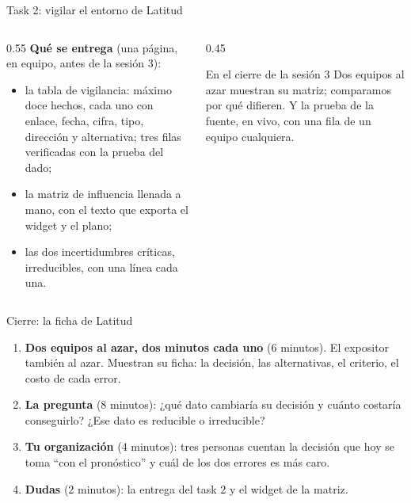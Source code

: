 \documentclass{beamer}
\begin{document}
\begin{frame}{Task 2: vigilar el entorno de Latitud}
\begin{columns}[T]
\begin{column}{0.55\textwidth}
\textbf{Qué se entrega} (una página, en equipo, antes de la sesión 3):
\begin{itemize}
  \item la tabla de vigilancia: máximo doce hechos, cada uno con enlace, fecha, cifra, tipo, dirección y alternativa; tres filas verificadas con la prueba del dado;
  \item la matriz de influencia llenada a mano, con el texto que exporta el widget y el plano;
  \item las dos incertidumbres críticas, irreducibles, con una línea cada una.
\end{itemize}
\end{column}
\begin{column}{0.45\textwidth}
\begin{exampleblock}{En el cierre de la sesión 3}
Dos equipos al azar muestran su matriz; comparamos por qué difieren. Y la prueba de la fuente, en vivo, con una fila de un equipo cualquiera.
\end{exampleblock}
\end{column}
\end{columns}
\end{frame}

\begin{frame}{Cierre: la ficha de Latitud}
\begin{enumerate}\itemsep8pt
  \item \textbf{Dos equipos al azar, dos minutos cada uno} (6 minutos). El expositor también al azar. Muestran su ficha: la decisión, las alternativas, el criterio, el costo de cada error.
  \item \textbf{La pregunta} (8 minutos): ¿qué dato cambiaría su decisión y cuánto costaría conseguirlo? ¿Ese dato es reducible o irreducible?
  \item \textbf{Tu organización} (4 minutos): tres personas cuentan la decisión que hoy se toma ``con el pronóstico'' y cuál de los dos errores es más caro.
  \item \textbf{Dudas} (2 minutos): la entrega del task 2 y el widget de la matriz.
\end{enumerate}
\end{frame}
\end{document}
